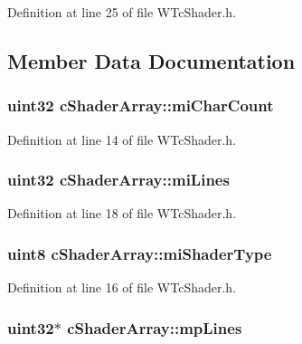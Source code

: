 Definition at line 25 of file WTcShader.h.



\subsection{Member Data Documentation}
\hypertarget{classc_shader_array_a148ffa979b89aadd045f69398c0816cb}{
\subsubsection[{miCharCount}]{\setlength{\rightskip}{0pt plus 5cm}uint32 {\bf cShaderArray::miCharCount}}}
\label{classc_shader_array_a148ffa979b89aadd045f69398c0816cb}


Definition at line 14 of file WTcShader.h.

\hypertarget{classc_shader_array_af36e89da0296b5e725db06b6e03e87c0}{
\subsubsection[{miLines}]{\setlength{\rightskip}{0pt plus 5cm}uint32 {\bf cShaderArray::miLines}}}
\label{classc_shader_array_af36e89da0296b5e725db06b6e03e87c0}


Definition at line 18 of file WTcShader.h.

\hypertarget{classc_shader_array_a6d584d6547232ff18e4bcc6c92343b99}{
\subsubsection[{miShaderType}]{\setlength{\rightskip}{0pt plus 5cm}uint8 {\bf cShaderArray::miShaderType}}}
\label{classc_shader_array_a6d584d6547232ff18e4bcc6c92343b99}


Definition at line 16 of file WTcShader.h.

\hypertarget{classc_shader_array_a7f5dbee262a24fed2cdcf2f241afa639}{
\subsubsection[{mpLines}]{\setlength{\rightskip}{0pt plus 5cm}uint32$\ast$ {\bf cShaderArray::mpLines}}}
\label{classc_shader_array_a7f5dbee262a24fed2cdcf2f241afa639}



